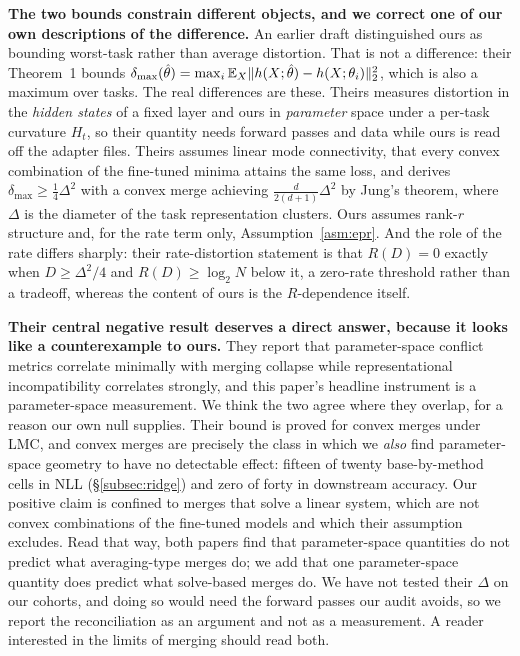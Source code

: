 \textbf{The two bounds constrain different objects, and we correct one of our
own descriptions of the difference.} An earlier draft distinguished ours as
bounding worst-task rather than average distortion. That is not a difference:
their Theorem~1 bounds $\delta_{\max}(\hat\theta) = \max_i
\mathbb{E}_X\|h(X;\hat\theta) - h(X;\theta_i)\|_2^2$, which is also a maximum over
tasks. The real differences are these. Theirs measures distortion in the
\emph{hidden states} of a fixed layer and ours in \emph{parameter} space under
a per-task curvature $H_t$, so their quantity needs forward passes and data
while ours is read off the adapter files. Theirs assumes linear mode
connectivity, that every convex combination of the fine-tuned minima attains
the same loss, and derives $\delta_{\max} \geq \tfrac14\Delta^2$ with a convex
merge achieving $\tfrac{d}{2(d+1)}\Delta^2$ by Jung's theorem, where $\Delta$
is the diameter of the task representation clusters. Ours assumes rank-$r$
structure and, for the rate term only, Assumption~\ref{asm:epr}. And the role
of the rate differs sharply: their rate-distortion statement is that
$R(D) = 0$ exactly when $D \geq \Delta^2/4$ and $R(D) \geq \log_2 N$ below it,
a zero-rate threshold rather than a tradeoff, whereas the content of ours is
the $R$-dependence itself.

\textbf{Their central negative result deserves a direct answer, because it
looks like a counterexample to ours.} They report that parameter-space
conflict metrics correlate minimally with merging collapse while
representational incompatibility correlates strongly, and this paper's
headline instrument is a parameter-space measurement. We think the two agree
where they overlap, for a reason our own null supplies. Their bound is proved
for convex merges under LMC, and convex merges are precisely the class in
which we \emph{also} find parameter-space geometry to have no detectable
effect: fifteen of twenty base-by-method cells in NLL
(\S\ref{subsec:ridge}) and zero of forty in downstream accuracy. Our positive
claim is confined to merges that solve a linear system, which are not convex
combinations of the fine-tuned models and which their assumption excludes.
Read that way, both papers find that parameter-space quantities do not predict
what averaging-type merges do; we add that one parameter-space quantity does
predict what solve-based merges do. We have not tested their $\Delta$ on our
cohorts, and doing so would need the forward passes our audit avoids, so we
report the reconciliation as an argument and not as a measurement. A reader
interested in the limits of merging should read both.

